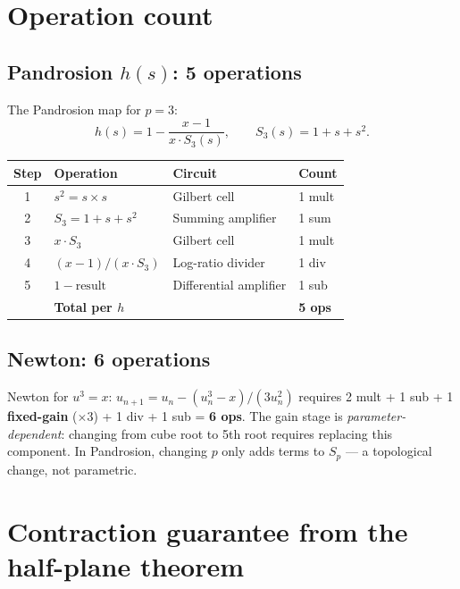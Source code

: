 \documentclass[10pt,a4paper,oneside]{book}
\theoremstyle{definition}
\theoremstyle{remark}
\begin{document}
\section{Operation count}

\subsection{Pandrosion $h(s)$: 5 operations}

The Pandrosion map for $p = 3$:
\[
  h(s) = 1 - \frac{x-1}{x \cdot S_3(s)}, \qquad S_3(s) = 1 + s + s^2.
\]

\begin{center}
\renewcommand{\arraystretch}{1.2}
\begin{tabular}{clll}
\toprule
\textbf{Step} & \textbf{Operation} & \textbf{Circuit} & \textbf{Count} \\
\midrule
1 & $s^2 = s \times s$ & Gilbert cell & 1 mult \\
2 & $S_3 = 1 + s + s^2$ & Summing amplifier & 1 sum \\
3 & $x \cdot S_3$ & Gilbert cell & 1 mult \\
4 & $(x-1)/(x \cdot S_3)$ & Log-ratio divider & 1 div \\
5 & $1 - \text{result}$ & Differential amplifier & 1 sub \\
\midrule
  & \textbf{Total per $h$} & & \textbf{5 ops} \\
\bottomrule
\end{tabular}
\end{center}

\subsection{Newton: 6 operations}

Newton for $u^3 = x$: $u_{n+1} = u_n - (u_n^3 - x)/(3u_n^2)$ requires 2 mult + 1 sub + 1 \textbf{fixed-gain} ($\times 3$) + 1 div + 1 sub = \textbf{6 ops}.  The gain stage is \emph{parameter-dependent}: changing from cube root to 5th root requires replacing this component.  In Pandrosion, changing $p$ only adds terms to $S_p$ --- a topological change, not parametric.

\section{Contraction guarantee from the half-plane theorem}
\end{document}
